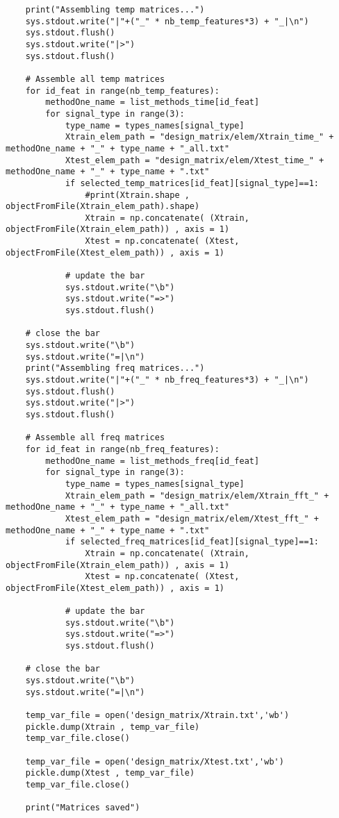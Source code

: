 \documentclass{article}
\begin{document}
\begin{lstlisting}
    print("Assembling temp matrices...")
    sys.stdout.write("|"+("_" * nb_temp_features*3) + "_|\n")
    sys.stdout.flush()
    sys.stdout.write("|>")
    sys.stdout.flush()
    
    # Assemble all temp matrices
    for id_feat in range(nb_temp_features):
        methodOne_name = list_methods_time[id_feat]
        for signal_type in range(3):
            type_name = types_names[signal_type]
            Xtrain_elem_path = "design_matrix/elem/Xtrain_time_" + methodOne_name + "_" + type_name + "_all.txt"
            Xtest_elem_path = "design_matrix/elem/Xtest_time_" + methodOne_name + "_" + type_name + ".txt"
            if selected_temp_matrices[id_feat][signal_type]==1:
                #print(Xtrain.shape , objectFromFile(Xtrain_elem_path).shape)
                Xtrain = np.concatenate( (Xtrain, objectFromFile(Xtrain_elem_path)) , axis = 1)
                Xtest = np.concatenate( (Xtest, objectFromFile(Xtest_elem_path)) , axis = 1)
                
            # update the bar
            sys.stdout.write("\b")
            sys.stdout.write("=>")
            sys.stdout.flush()  
            
    # close the bar
    sys.stdout.write("\b")
    sys.stdout.write("=|\n")
    print("Assembling freq matrices...")
    sys.stdout.write("|"+("_" * nb_freq_features*3) + "_|\n")
    sys.stdout.flush()
    sys.stdout.write("|>")
    sys.stdout.flush()
    
    # Assemble all freq matrices
    for id_feat in range(nb_freq_features):
        methodOne_name = list_methods_freq[id_feat]
        for signal_type in range(3):
            type_name = types_names[signal_type]
            Xtrain_elem_path = "design_matrix/elem/Xtrain_fft_" + methodOne_name + "_" + type_name + "_all.txt"
            Xtest_elem_path = "design_matrix/elem/Xtest_fft_" + methodOne_name + "_" + type_name + ".txt"
            if selected_freq_matrices[id_feat][signal_type]==1:
                Xtrain = np.concatenate( (Xtrain, objectFromFile(Xtrain_elem_path)) , axis = 1)
                Xtest = np.concatenate( (Xtest, objectFromFile(Xtest_elem_path)) , axis = 1)
                
            # update the bar
            sys.stdout.write("\b")
            sys.stdout.write("=>")
            sys.stdout.flush()  
            
    # close the bar
    sys.stdout.write("\b")
    sys.stdout.write("=|\n")
    
    temp_var_file = open('design_matrix/Xtrain.txt','wb')
    pickle.dump(Xtrain , temp_var_file)
    temp_var_file.close()
    
    temp_var_file = open('design_matrix/Xtest.txt','wb')
    pickle.dump(Xtest , temp_var_file)
    temp_var_file.close()
    
    print("Matrices saved")
\end{lstlisting}
\end{document}
